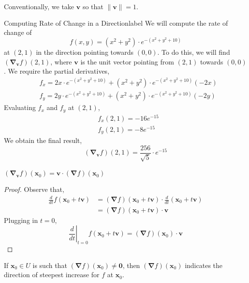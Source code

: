 \begin{rmk}
    Conventionally, we take $\mathbf{v}$ so that $\|\mathbf{v}\| = 1$.
\end{rmk}

\begin{ex}{Computing Rate of Change in a Direction}{label}
    We will compute the rate of change of
    \[f(x, y)=\left(x^2+y^2\right) \cdot e^{-\left(x^2+y^2+10\right)}\]
    at $(2,1)$ in the direction pointing towards $(0,0)$. To do this, we will find $\left(\mathbf{\nabla}_{\mathbf{v}} f\right)(2,1)$, where $\mathbf{v}$ is the unit vector pointing from $(2,1)$ towards $(0,0)$. We require the partial derivatives,
    \begin{align*}
        &f_x=2 x \cdot e^{-\left(x^2+y^2+10\right)}+\left(x^2+y^2\right) \cdot e^{-\left(x^2+y^2+10\right)}(-2 x) \\
        &f_y=2 y \cdot e^{-\left(x^2+y^2+10\right)}+\left(x^2+y^2\right) \cdot e^{-\left(x^2+y^2+10\right)}(-2 y)
    \end{align*}
    Evaluating $f_x$ and $f_y$ at $(2,1)$,
    \begin{align*}
    &f_x(2,1)=-16 e^{-15} \\
    &f_y(2,1)=-8 e^{-15}
    \end{align*}
    We obtain the final result,
    \[\left(\mathbf{\nabla}_{\mathbf{v}} f\right)(2,1)=\frac{256}{\sqrt{5}} \cdot e^{-15}\]
\end{ex}

\begin{thm}
    $\left(\mathbf{\nabla}_{\mathbf{v}} f\right)\left(\mathbf{x}_0\right)=\mathbf{v} \cdot(\mathbf{\nabla} f)\left(\mathbf{x}_0\right)$
\end{thm}

\begin{proof}
    Observe that,
    \begin{align*}
        \frac{d}{d t} f\left(\mathbf{x}_0+t \mathbf{v}\right) &=(\mathbf{\nabla} f)\left(\mathbf{x}_0+t \mathbf{v}\right) \cdot \frac{d}{d t}\left(\mathbf{x}_0+t \mathbf{v}\right) \\ &=(\mathbf{\nabla} f)\left(\mathbf{x}_0+t \mathbf{v}\right) \cdot \mathbf{v} 
    \end{align*}
    Plugging in $t = 0$,
    \[\left.\frac{d}{d t}\right|_{t=0} f\left(\mathbf{x}_0+t \mathbf{v}\right)=(\mathbf{\nabla} f)\left(\mathbf{x}_0\right) \cdot \mathbf{v}\]
\end{proof}

\begin{cor}
    If $\mathbf{x}_0 \in U$ is such that $(\mathbf{\nabla} f)\left(\mathbf{x}_0\right) \neq \mathbf{0}$, then $(\mathbf{\nabla} f)\left(\mathbf{x}_0\right)$ indicates the direction of steepest increase for $f$ at $\mathbf{x}_0$.
\end{cor}

